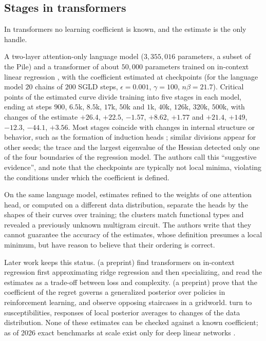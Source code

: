 \begin{refsection}
\subsection*{Stages in transformers}

In transformers no learning coefficient is known, and the estimate is the only handle.

\begin{observation}
A two-layer attention-only language model ($3{,}355{,}016$ parameters, a subset of the Pile) and a transformer of about $50{,}000$ parameters trained on in-context linear regression \parencite{GargEtAl2022}, with the coefficient estimated at checkpoints (for the language model $20$ chains of $200$ SGLD steps, $\epsilon=0.001$, $\gamma=100$, $n\beta=21.7$). Critical points of the estimated curve divide training into five stages in each model, ending at steps $900$, $6.5$k, $8.5$k, $17$k, $50$k and $1$k, $40$k, $126$k, $320$k, $500$k, with changes of the estimate $+26.4$, $+22.5$, $-1.57$, $+8.62$, $+1.77$ and $+21.4$, $+149$, $-12.3$, $-44.1$, $+3.56$. Most stages coincide with changes in internal structure or behavior, such as the formation of induction heads \parencite{OlssonEtAl2022}; similar divisions appear for other seeds; the trace and the largest eigenvalue of the Hessian detected only one of the four boundaries of the regression model. The authors call this ``suggestive evidence'', and note that the checkpoints are typically not local minima, violating the conditions under which the coefficient is defined.
\end{observation}

\begin{observation}
On the same language model, estimates refined to the weights of one attention head, or computed on a different data distribution, separate the heads by the shapes of their curves over training; the clusters match functional types and revealed a previously unknown multigram circuit. The authors write that they cannot guarantee the accuracy of the estimates, whose definition presumes a local minimum, but have reason to believe that their ordering is correct.
\end{observation}

Later work keeps this status. \Textcite{CarrollEtAl2025} (a preprint) find transformers on in-context regression first approximating ridge regression and then specializing, and read the estimates as a trade-off between loss and complexity. \Textcite{ElliottEtAl2026a} (a preprint) prove that the coefficient of the regret governs a generalized posterior over policies in reinforcement learning, and observe opposing staircases in a gridworld. \Textcite{BakerEtAl2026} turn to susceptibilities, responses of local posterior averages to changes of the data distribution. None of these estimates can be checked against a known coefficient; as of 2026 exact benchmarks at scale exist only for deep linear networks \parencite{HitchcockHoogland2025}.


\end{refsection}
